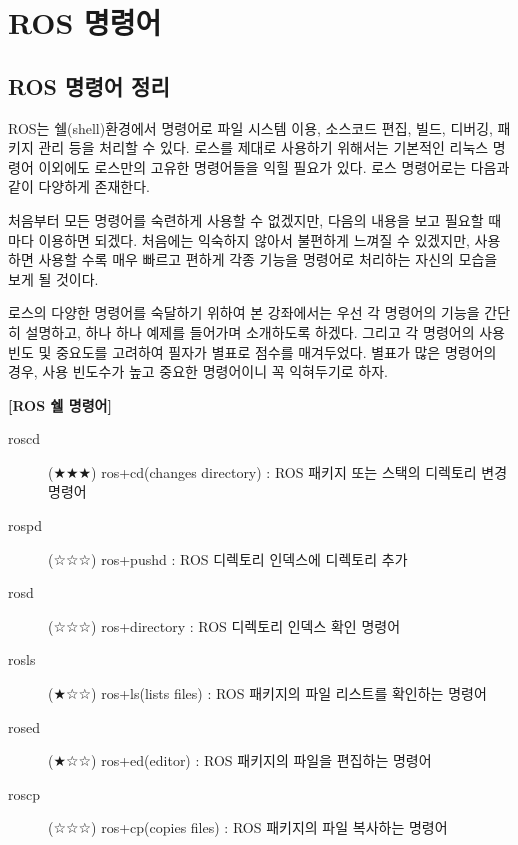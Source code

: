 

\chapter{ROS 명령어}

\section{ROS 명령어 정리}

ROS는 쉘(shell)환경에서 명령어로 파일 시스템 이용, 소스코드 편집, 빌드, 디버깅, 패키지 관리 등을 처리할 수 있다. 로스를 제대로 사용하기 위해서는 기본적인 리눅스 명령어 이외에도 로스만의 고유한 명령어들을 익힐 필요가 있다. 로스 명령어로는 다음과 같이 다양하게 존재한다. 

처음부터 모든 명령어를 숙련하게 사용할 수 없겠지만, 다음의 내용을 보고 필요할 때마다 이용하면 되겠다. 처음에는 익숙하지 않아서 불편하게 느껴질 수 있겠지만, 사용하면 사용할 수록 매우 빠르고 편하게 각종 기능을 명령어로 처리하는 자신의 모습을 보게 될 것이다.

로스의 다양한 명령어를 숙달하기 위하여 본 강좌에서는 우선 각 명령어의 기능을 간단히 설명하고, 하나 하나 예제를 들어가며 소개하도록 하겠다. 그리고 각 명령어의 사용 빈도 및 중요도를 고려하여 필자가 별표로 점수를 매겨두었다. 별표가 많은 명령어의 경우, 사용 빈도수가 높고 중요한 명령어이니 꼭 익혀두기로 하자.

\vspace{\baselineskip}
\noindent
\textbf{[ROS 쉘 명령어]}
\begin{description}
\item[roscd] (★★★) ros+cd(changes directory) : ROS 패키지 또는 스택의 디렉토리 변경 명령어
\item[rospd] (☆☆☆) ros+pushd : ROS 디렉토리 인덱스에 디렉토리 추가
\item[rosd] (☆☆☆) ros+directory : ROS 디렉토리 인덱스 확인 명령어
\item[rosls] (★☆☆) ros+ls(lists files) : ROS 패키지의 파일 리스트를 확인하는 명령어
\item[rosed] (★☆☆) ros+ed(editor) : ROS 패키지의 파일을 편집하는 명령어
\item[roscp] (☆☆☆) ros+cp(copies files) : ROS 패키지의 파일 복사하는 명령어
\end{description}

